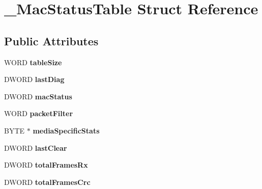 \hypertarget{struct___mac_status_table}{
\section{\_\-MacStatusTable Struct Reference}
\label{struct___mac_status_table}
}
\subsection*{Public Attributes}
\begin{DoxyCompactItemize}
\item 
\hypertarget{struct___mac_status_table_a5046179c43a29a396bb85354f3f428c3}{
WORD {\bfseries tableSize}}
\label{struct___mac_status_table_a5046179c43a29a396bb85354f3f428c3}

\item 
\hypertarget{struct___mac_status_table_adad3b759b77d2d22fe26d8d87599aa82}{
DWORD {\bfseries lastDiag}}
\label{struct___mac_status_table_adad3b759b77d2d22fe26d8d87599aa82}

\item 
\hypertarget{struct___mac_status_table_a8213f50389146241c35cbf86c12d7cdc}{
DWORD {\bfseries macStatus}}
\label{struct___mac_status_table_a8213f50389146241c35cbf86c12d7cdc}

\item 
\hypertarget{struct___mac_status_table_af34606116ae8d2ad4e3b16454cdb3c62}{
WORD {\bfseries packetFilter}}
\label{struct___mac_status_table_af34606116ae8d2ad4e3b16454cdb3c62}

\item 
\hypertarget{struct___mac_status_table_a9c5f2c617f6745d1bcc565211c6aa550}{
BYTE $\ast$ {\bfseries mediaSpecificStats}}
\label{struct___mac_status_table_a9c5f2c617f6745d1bcc565211c6aa550}

\item 
\hypertarget{struct___mac_status_table_ae230fbda7bd597ed1f5c90c84908f3d4}{
DWORD {\bfseries lastClear}}
\label{struct___mac_status_table_ae230fbda7bd597ed1f5c90c84908f3d4}

\item 
\hypertarget{struct___mac_status_table_a43b89d44e387df862bfd8961b8dda6c5}{
DWORD {\bfseries totalFramesRx}}
\label{struct___mac_status_table_a43b89d44e387df862bfd8961b8dda6c5}

\item 
\hypertarget{struct___mac_status_table_a7bfd3c210d1d1c3204acb857fcb01dff}{
DWORD {\bfseries totalFramesCrc}}
\label{struct___mac_status_table_a7bfd3c210d1d1c3204acb857fcb01dff}


\end{DoxyCompactItemize}

